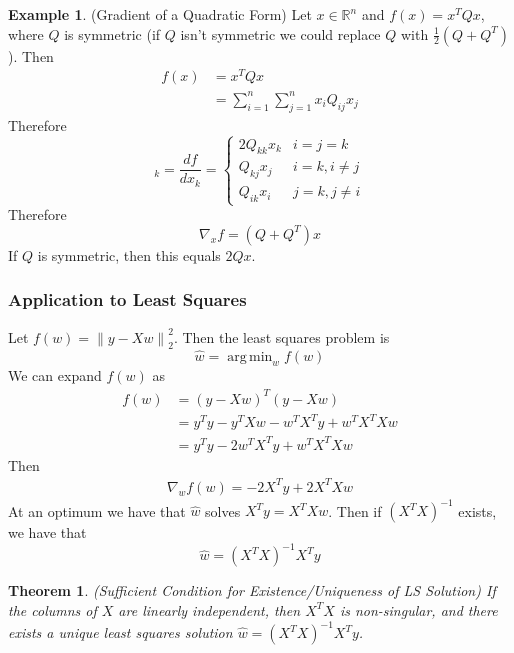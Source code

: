 \documentclass[12pt]{article}
\newtheorem{theorem}{Theorem}
\theoremstyle{definition}
\newtheorem{example}{Example}
\DeclareMathOperator*{\argmin}{arg\,min}
\newcommand{\R}{\mathbb{R}}
\newcommand{\norm}[1]{\left\lVert#1\right\rVert}
\begin{document}
\begin{example}(Gradient of a Quadratic Form)
Let $x \in \R^n$ and $f(x) = x^T Q x$, where $Q$ is symmetric (if $Q$ isn't symmetric we could replace $Q$ with $\frac{1}{2}(Q + Q^T)$).
Then
\begin{align*}
	f(x) &= x^T Q x \\
	&= \sum_{i=1}^n \sum_{j=1}^n x_i Q_{ij}x_j
\end{align*}
Therefore
\begin{equation}
	[\nabla_x f]_k = \frac{d f}{d x_k} = \begin{cases}
	2 Q_{kk} x_k & i=j=k \\
	Q_{kj} x_j & i =k, i \neq j \\
	Q_{ik} x_i & j = k, j \neq i
	\end{cases}
\end{equation}
Therefore
\begin{equation}
	\nabla_x f = (Q + Q^T) x 
\end{equation}
If $Q$ is symmetric, then this equals $2Qx$.
\end{example}

\subsubsection{Application to Least Squares}
Let $f(w) = \norm{y - Xw}_2^2$. Then the least squares problem is 
\begin{equation}
	\hat{w} = \argmin_w f(w)
\end{equation}
We can expand $f(w)$ as
\begin{align*}
	f(w) &= (y - Xw)^T(y - Xw) \\
	&= y^T y - y^T X w - w^T X^T y + w^T X^T X w \\
	&= y^T y - 2 w^T X^T y + w^T X^T X w
\end{align*}
Then
\begin{align*}
	\nabla_w f(w) = -2 X^T y + 2 X^T X w
\end{align*}
At an optimum we have that $\hat{w}$ solves $X^T y = X^T X w$. Then if $(X^T X)^{-1}$ exists, we have that
\begin{equation}
	\hat{w} = (X^T X)^{-1} X^T y
\end{equation}

\begin{theorem}(Sufficient Condition for Existence/Uniqueness of LS Solution)
If the columns of $X$ are linearly independent, then $X^T X$ is non-singular, and there exists a unique least squares solution $\hat{w} = (X^T X)^{-1} X^T y$.
\end{theorem}
\end{document}

